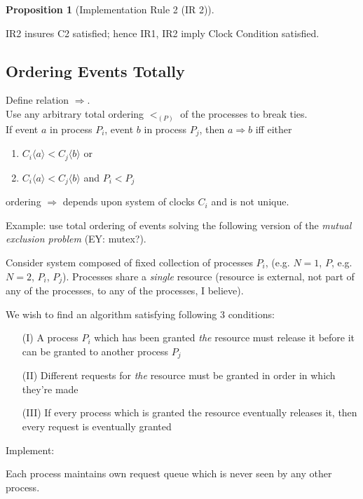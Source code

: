 \documentclass[10pt]{amsart}
\newtheorem{proposition}{Proposition}
\begin{document}
\begin{multicols*}{2}
\begin{proposition}[Implementation Rule 2 (IR 2)]
\end{proposition}
IR2 insures C2 satisfied; hence IR1, IR2 imply Clock Condition satisfied.


\subsection{Ordering Events Totally}

Define relation $\Longrightarrow$. \\
Use any arbitrary total ordering $<_{(P)}$ of the processes to break ties. \\
If event $a$ in process $P_i$, event $b$ in process $P_j$, then $a \Longrightarrow b$ iff either 
\begin{enumerate}
	\item $C_i\langle a \rangle < C_j \langle b \rangle $ or 
	\item $C_i \langle a \rangle < C_j \langle b \rangle$ and $P_i < P_j$ 
\end{enumerate}
ordering $\Longrightarrow$ depends upon system of clocks $C_i$ and is not unique.

Example: use total ordering of events solving the following version of the \emph{mutual exclusion problem} (EY: mutex?).

Consider system composed of fixed collection of processes $P_i$, (e.g. $N=1$, $P$, e.g. $N=2$, $P_i$, $P_j$). Processes share a \emph{single} resource (resource is external, not part of any of the processes, to any of the processes, I believe). 

We wish to find an algorithm satisfying following 3 conditions:
\begin{enumerate}
	\item[(I)] A process $P_i$ which has been granted \emph{the} resource must release it before it can be granted to another process $P_j$ 
	\item[(II)] Different requests for \emph{the} resource must be granted in order in which they're made
	\item[(III)] If every process which is granted the resource eventually releases it, then every request is eventually granted
\end{enumerate}

Implement:

Each  process maintains own request queue which is never seen by any other process.


\end{multicols*}
\end{document}
